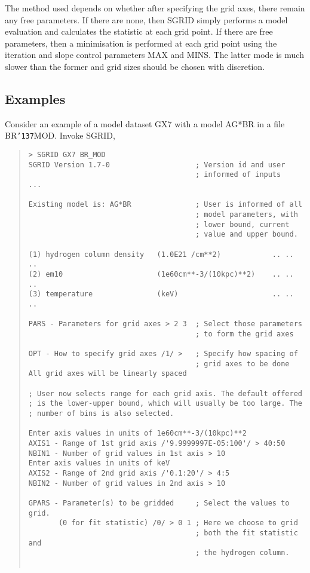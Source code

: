 \documentclass{book}
\renewcommand{\_}{{\tt\char'137}}     %
\begin{document}
The method used depends on whether after specifying the grid
axes, there remain any free parameters. If there are none, then
SGRID simply performs a model evaluation and calculates the
statistic at each grid point. If there are free parameters,
then a minimisation is performed at each grid point using the
iteration and slope control parameters MAX and MINS. The latter
mode is much slower than the former and grid sizes should be
chosen with discretion.
 
\subsection{Examples}
Consider an example of a model dataset GX7 with a model AG*BR
in a file BR\_MOD. Invoke SGRID,
\begin{quote}\begin{verbatim}
> SGRID GX7 BR_MOD
SGRID Version 1.7-0                    ; Version id and user
                                       ; informed of inputs
...
 
Existing model is: AG*BR               ; User is informed of all
                                       ; model parameters, with
                                       ; lower bound, current
                                       ; value and upper bound.
 
(1) hydrogen column density   (1.0E21 /cm**2)            .. .. ..
(2) em10                      (1e60cm**-3/(10kpc)**2)    .. .. ..
(3) temperature               (keV)                      .. .. ..
 
PARS - Parameters for grid axes > 2 3  ; Select those parameters
                                       ; to form the grid axes
 
OPT - How to specify grid axes /1/ >   ; Specify how spacing of
                                       ; grid axes to be done
All grid axes will be linearly spaced
 
; User now selects range for each grid axis. The default offered
; is the lower-upper bound, which will usually be too large. The
; number of bins is also selected.
 
Enter axis values in units of 1e60cm**-3/(10kpc)**2
AXIS1 - Range of 1st grid axis /'9.9999997E-05:100'/ > 40:50
NBIN1 - Number of grid values in 1st axis > 10
Enter axis values in units of keV
AXIS2 - Range of 2nd grid axis /'0.1:20'/ > 4:5
NBIN2 - Number of grid values in 2nd axis > 10
 
GPARS - Parameter(s) to be gridded     ; Select the values to grid.
       (0 for fit statistic) /0/ > 0 1 ; Here we choose to grid
                                       ; both the fit statistic and
                                       ; the hydrogen column.
 

\end{verbatim}
\end{quote}
\end{document}
